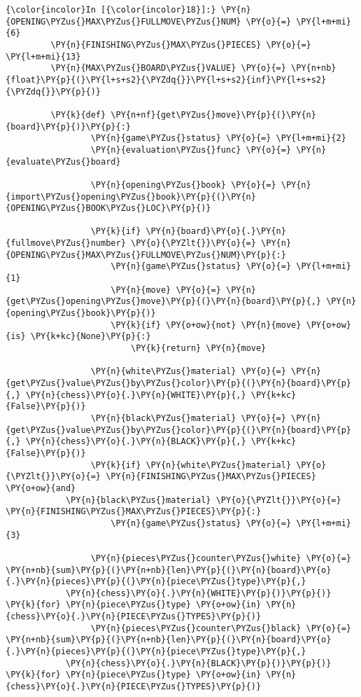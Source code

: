   \begin{Verbatim}[commandchars=\\\{\}]
{\color{incolor}In [{\color{incolor}18}]:} \PY{n}{OPENING\PYZus{}MAX\PYZus{}FULLMOVE\PYZus{}NUM} \PY{o}{=} \PY{l+m+mi}{6}
         \PY{n}{FINISHING\PYZus{}MAX\PYZus{}PIECES} \PY{o}{=} \PY{l+m+mi}{13}
         \PY{n}{MAX\PYZus{}BOARD\PYZus{}VALUE} \PY{o}{=} \PY{n+nb}{float}\PY{p}{(}\PY{l+s+s2}{\PYZdq{}}\PY{l+s+s2}{inf}\PY{l+s+s2}{\PYZdq{}}\PY{p}{)}
         
         \PY{k}{def} \PY{n+nf}{get\PYZus{}move}\PY{p}{(}\PY{n}{board}\PY{p}{)}\PY{p}{:}
                 \PY{n}{game\PYZus{}status} \PY{o}{=} \PY{l+m+mi}{2}
                 \PY{n}{evaluation\PYZus{}func} \PY{o}{=} \PY{n}{evaluate\PYZus{}board}
                 
                 \PY{n}{opening\PYZus{}book} \PY{o}{=} \PY{n}{import\PYZus{}opening\PYZus{}book}\PY{p}{(}\PY{n}{OPENING\PYZus{}BOOK\PYZus{}LOC}\PY{p}{)}
                 
                 \PY{k}{if} \PY{n}{board}\PY{o}{.}\PY{n}{fullmove\PYZus{}number} \PY{o}{\PYZlt{}}\PY{o}{=} \PY{n}{OPENING\PYZus{}MAX\PYZus{}FULLMOVE\PYZus{}NUM}\PY{p}{:}
                     \PY{n}{game\PYZus{}status} \PY{o}{=} \PY{l+m+mi}{1}
                     \PY{n}{move} \PY{o}{=} \PY{n}{get\PYZus{}opening\PYZus{}move}\PY{p}{(}\PY{n}{board}\PY{p}{,} \PY{n}{opening\PYZus{}book}\PY{p}{)}
                     \PY{k}{if} \PY{o+ow}{not} \PY{n}{move} \PY{o+ow}{is} \PY{k+kc}{None}\PY{p}{:}
                         \PY{k}{return} \PY{n}{move}
                 
                 \PY{n}{white\PYZus{}material} \PY{o}{=} \PY{n}{get\PYZus{}value\PYZus{}by\PYZus{}color}\PY{p}{(}\PY{n}{board}\PY{p}{,} \PY{n}{chess}\PY{o}{.}\PY{n}{WHITE}\PY{p}{,} \PY{k+kc}{False}\PY{p}{)}
                 \PY{n}{black\PYZus{}material} \PY{o}{=} \PY{n}{get\PYZus{}value\PYZus{}by\PYZus{}color}\PY{p}{(}\PY{n}{board}\PY{p}{,} \PY{n}{chess}\PY{o}{.}\PY{n}{BLACK}\PY{p}{,} \PY{k+kc}{False}\PY{p}{)}
                 \PY{k}{if} \PY{n}{white\PYZus{}material} \PY{o}{\PYZlt{}}\PY{o}{=} \PY{n}{FINISHING\PYZus{}MAX\PYZus{}PIECES} \PY{o+ow}{and} 
			\PY{n}{black\PYZus{}material} \PY{o}{\PYZlt{}}\PY{o}{=} \PY{n}{FINISHING\PYZus{}MAX\PYZus{}PIECES}\PY{p}{:}
                     \PY{n}{game\PYZus{}status} \PY{o}{=} \PY{l+m+mi}{3}
                     
                 \PY{n}{pieces\PYZus{}counter\PYZus{}white} \PY{o}{=} \PY{n+nb}{sum}\PY{p}{(}\PY{n+nb}{len}\PY{p}{(}\PY{n}{board}\PY{o}{.}\PY{n}{pieces}\PY{p}{(}\PY{n}{piece\PYZus{}type}\PY{p}{,} 
			\PY{n}{chess}\PY{o}{.}\PY{n}{WHITE}\PY{p}{)}\PY{p}{)} \PY{k}{for} \PY{n}{piece\PYZus{}type} \PY{o+ow}{in} \PY{n}{chess}\PY{o}{.}\PY{n}{PIECE\PYZus{}TYPES}\PY{p}{)}
                 \PY{n}{pieces\PYZus{}counter\PYZus{}black} \PY{o}{=} \PY{n+nb}{sum}\PY{p}{(}\PY{n+nb}{len}\PY{p}{(}\PY{n}{board}\PY{o}{.}\PY{n}{pieces}\PY{p}{(}\PY{n}{piece\PYZus{}type}\PY{p}{,} 
			\PY{n}{chess}\PY{o}{.}\PY{n}{BLACK}\PY{p}{)}\PY{p}{)} \PY{k}{for} \PY{n}{piece\PYZus{}type} \PY{o+ow}{in} \PY{n}{chess}\PY{o}{.}\PY{n}{PIECE\PYZus{}TYPES}\PY{p}{)}
                 

\end{Verbatim}
